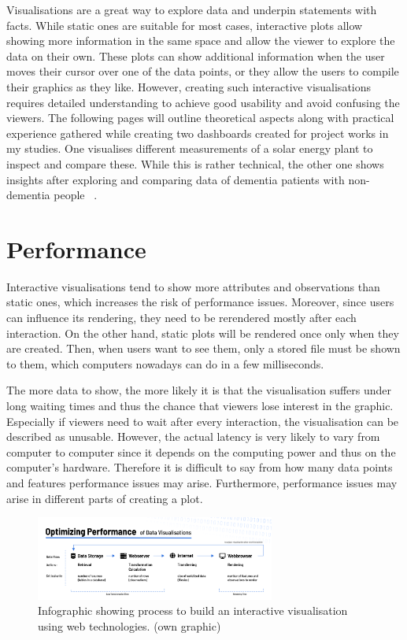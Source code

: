 \documentclass[11pt]{article}
\begin{document}
Visualisations are a great way to explore data and underpin statements with facts. While static ones are suitable for most cases, interactive plots allow showing more information in the same space and allow the viewer to explore the data on their own. These plots can show additional information when the user moves their cursor over one of the data points, or they allow the users to compile their graphics as they like. However, creating such interactive visualisations requires detailed understanding to achieve good usability and avoid confusing the viewers. The following pages will outline theoretical aspects along with practical experience gathered while creating two dashboards created for project works in my studies. One visualises different measurements of a solar energy plant to inspect and compare these. While this is rather technical, the other one shows insights after exploring and comparing data of dementia patients with non-dementia people ~\parencite{alzheimers_disease_neuroimaging_initiative_adni_2022}.

\section{Performance}

Interactive visualisations tend to show more attributes and observations than static ones, which increases the risk of performance issues. Moreover, since users can influence its rendering, they need to be rerendered mostly after each interaction. On the other hand, static plots will be rendered once only when they are created. Then, when users want to see them, only a stored file must be shown to them, which computers nowadays can do in a few milliseconds.

The more data to show, the more likely it is that the visualisation suffers under long waiting times and thus the chance that viewers lose interest in the graphic. Especially if viewers need to wait after every interaction, the visualisation can be described as unusable. However, the actual latency is very likely to vary from computer to computer since it depends on the computing power and thus on the computer's hardware. Therefore it is difficult to say from how many data points and features performance issues may arise. Furthermore, performance issues may arise in different parts of creating a plot.

\begin{figure}
    \centering
    \includegraphics[width=0.7\textwidth]{./performance.png}
    \caption{Infographic showing process to build an interactive visualisation using web technologies. (own graphic)}
\end{figure}
\end{document}
